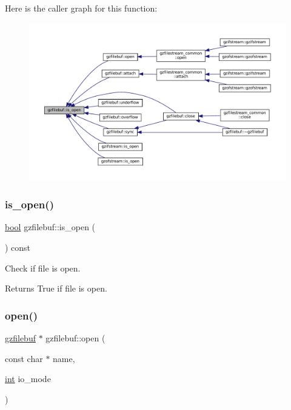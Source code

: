 Here is the caller graph for this function\+:
\nopagebreak
\begin{figure}[H]
\begin{center}
\leavevmode
\includegraphics[width=350pt]{classgzfilebuf_af2619b96e3ddea9050be70dd21de4752_icgraph}
\end{center}
\end{figure}
\mbox{\label{classgzfilebuf_a24dfb3e35c147aaf3a562c1ea4268757}} 
\subsubsection{\texorpdfstring{is\+\_\+open()}{is\_open()}\hspace{0.1cm}{\footnotesize\ttfamily [2/2]}}
{\footnotesize\ttfamily \mbox{\hyperlink{libretro_8h_a4a26dcae73fb7e1528214a068aca317e}{bool}} gzfilebuf\+::is\+\_\+open (\begin{DoxyParamCaption}{ }\end{DoxyParamCaption}) const\hspace{0.3cm}{\ttfamily [inline]}}



Check if file is open. 

\begin{DoxyReturn}{Returns}
True if file is open. 
\end{DoxyReturn}
\mbox{\label{classgzfilebuf_ae1fbc989b2dae79dba798556542c147c}} 
\subsubsection{\texorpdfstring{open()}{open()}\hspace{0.1cm}{\footnotesize\ttfamily [1/2]}}
{\footnotesize\ttfamily \mbox{\hyperlink{classgzfilebuf}{gzfilebuf}} $\ast$ gzfilebuf\+::open (\begin{DoxyParamCaption}\item[{const char $\ast$}]{name,  }\item[{\mbox{\hyperlink{ioapi_8h_a787fa3cf048117ba7123753c1e74fcd6}{int}}}]{io\+\_\+mode }\end{DoxyParamCaption})}

